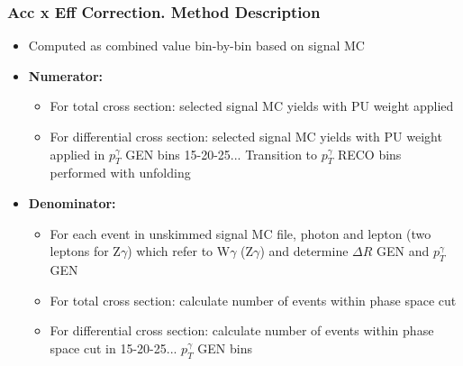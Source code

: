 \begin{frame}\frametitle{Acc x Eff Correction. Method Description}
\begin{itemize}
  \item {\footnotesize{Computed as combined value bin-by-bin based on signal MC}}
  \item {\footnotesize\bfseries{Numerator:}}
  \begin{itemize}
     \scriptsize
     \item For total cross section: selected signal MC yields with PU weight applied
     \item For differential cross section: selected signal MC yields with PU weight applied in $p_T^{\gamma}$ GEN bins 15-20-25... Transition to $p_T^{\gamma}$ RECO bins performed with unfolding
  \end{itemize}
  \item {\footnotesize\bfseries{Denominator:}}
  \begin{itemize}
     \scriptsize
     \item For each event in unskimmed signal MC file, photon and lepton (two leptons for Z$\gamma$) which refer to W$\gamma$ (Z$\gamma$) and determine $\Delta{R}$ GEN and $p_T^{\gamma}$ GEN
     \item For total cross section: calculate number of events within phase space cut
     \item For differential cross section: calculate number of events within phase space cut in 15-20-25... $p_T^{\gamma}$ GEN bins
  \end{itemize}
\end{itemize}
\end{frame}%
